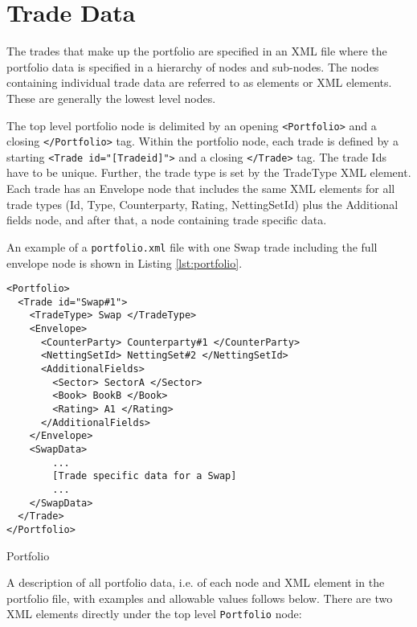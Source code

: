 \section{Trade Data}\label{sec:portfolio_data}

The trades that make up the portfolio are specified in an XML file where the portfolio data is specified in a hierarchy
of nodes and sub-nodes.  The nodes containing individual trade data are referred to as elements or XML elements. These
are generally the lowest level nodes.

\vspace{1em}

The top level portfolio node is delimited by an opening {\tt <Portfolio>} and a closing {\tt </Portfolio>} tag. Within
the portfolio node, each trade is defined by a starting {\tt <Trade id="[Tradeid]">} and a closing {\tt </Trade>} tag. The trade Ids have to be unique.
Further, the trade type is set by the TradeType XML element. Each trade has an Envelope node that includes the same XML
elements for all trade types (Id, Type, Counterparty, Rating, NettingSetId) plus the Additional fields node, and after
that, a node containing trade specific data.

\vspace{1em}
An example of a {\tt portfolio.xml} file with one Swap trade including the full envelope node is shown in Listing \ref{lst:portfolio}.

\begin{listing}[H]
\begin{verbatim}
<Portfolio>
  <Trade id="Swap#1">
    <TradeType> Swap </TradeType>
    <Envelope>
      <CounterParty> Counterparty#1 </CounterParty>
      <NettingSetId> NettingSet#2 </NettingSetId>
      <AdditionalFields>
        <Sector> SectorA </Sector>
        <Book> BookB </Book>
        <Rating> A1 </Rating>
      </AdditionalFields>
    </Envelope>
    <SwapData>
        ...
        [Trade specific data for a Swap]
        ...
    </SwapData>
  </Trade>
</Portfolio>
\end{verbatim}
\caption{Portfolio}
\label{lst:portfolio}
\end{listing}

A description of all portfolio data, i.e. of each node and XML element in the portfolio file, with examples and
allowable values follows below. There are two XML elements directly under the top level {\tt Portfolio} node:

